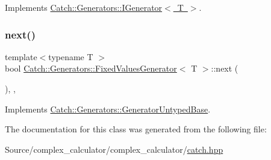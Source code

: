 Implements \mbox{\hyperlink{struct_catch_1_1_generators_1_1_i_generator_a525d381fc9249a885b075a0632a8579a}{Catch\+::\+Generators\+::\+I\+Generator$<$ T $>$}}.

\mbox{\label{class_catch_1_1_generators_1_1_fixed_values_generator_a6ce9e3ed045239c7b82873f24bd9cd3b}} 
\subsubsection{\texorpdfstring{next()}{next()}}
{\footnotesize\ttfamily template$<$typename T $>$ \\
bool \mbox{\hyperlink{class_catch_1_1_generators_1_1_fixed_values_generator}{Catch\+::\+Generators\+::\+Fixed\+Values\+Generator}}$<$ T $>$\+::next (\begin{DoxyParamCaption}{ }\end{DoxyParamCaption})\hspace{0.3cm}{\ttfamily [inline]}, {\ttfamily [override]}, {\ttfamily [virtual]}}



Implements \mbox{\hyperlink{class_catch_1_1_generators_1_1_generator_untyped_base_aeed3c0cd6233c5f553549e453b8d6638}{Catch\+::\+Generators\+::\+Generator\+Untyped\+Base}}.



The documentation for this class was generated from the following file\+:\begin{DoxyCompactItemize}
\item 
Source/complex\+\_\+calculator/complex\+\_\+calculator/\mbox{\hyperlink{catch_8hpp}{catch.\+hpp}}\end{DoxyCompactItemize}
